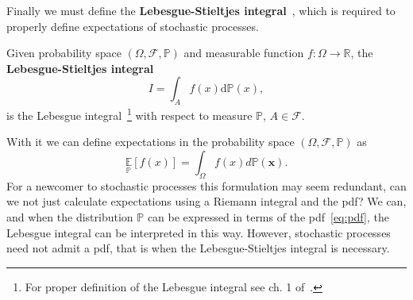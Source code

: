 Finally we must define the \textbf{Lebesgue-Stieltjes integral}~\cite{halmos2013measure}, which is required to properly define expectations of stochastic processes. 
\begin{definition}
		Given probability space $(\Omega, \mathcal{F}, \mathbb{P})$ and measurable function $f:\Omega \rightarrow \mathbb{R}$, the \textbf{Lebesgue-Stieltjes integral} 
		\begin{equation}
			I = \int_A f(x) \mathrm{d}\mathbb{P}(x),
		\end{equation}
		is the Lebesgue integral~\footnote{For proper definition of the Lebesgue integral see ch. 1 of~\cite{salamon2016measure}.} with respect to measure $\mathbb{P}$, $A \in \mathcal{F}$.
\end{definition}
With it we can define expectations in the probability space $(\Omega, \mathcal{F}, \mathbb{P})$ as
\begin{equation}
	\underset{{\mathbb{P}}}{\mathbb{E}}[f(x)]=\int_{\Omega} f(x) d \mathbb{P}(\boldsymbol{x}).
\end{equation}
For a newcomer to stochastic processes this formulation may seem redundant, can we not just calculate expectations using a Riemann integral and the pdf? We can, and when the distribution $\mathbb{P}$ can be expressed in terms of the pdf~\eqref{eq:pdf}, the Lebesgue integral can be interpreted in this way. However, stochastic processes need not admit a pdf, that is when the Lebesgue-Stieltjes integral is necessary.
